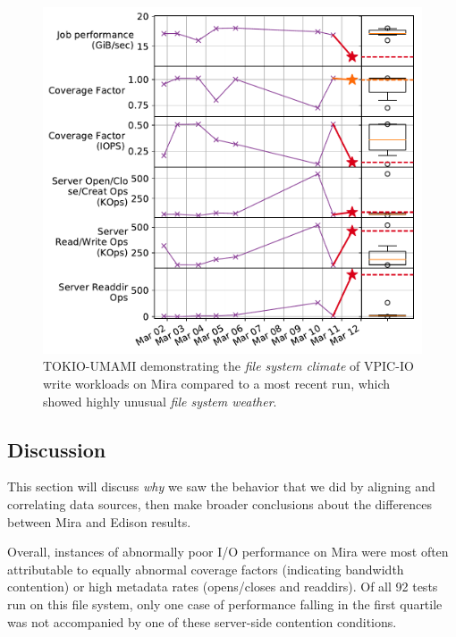 {\begin{figure}[t]
    \centering
    \includegraphics[width=1.0\columnwidth]{figs/umami-mira-fs1-vpic-write.pdf}
    \caption{TOKIO-UMAMI demonstrating the \emph{file system climate} of VPIC-IO write workloads
    on Mira compared to a most recent run, which showed
    highly unusual \emph{file system weather}.}
    \label{fig:umami-mira-fs1-vpic-write}
\end{figure}

\subsection{Discussion} \label{sec:results/discussion}

This section will discuss \emph{why} we saw the behavior that we did by
aligning and correlating data sources, then make broader conclusions about the
differences between Mira and Edison results.

Overall, instances of abnormally poor I/O performance on Mira were most often attributable to equally abnormal coverage factors (indicating bandwidth contention) or high metadata rates (opens/closes and readdirs).  Of all 92 tests run on this file system, only one case of performance falling in the first quartile was not accompanied by one of these server-side contention conditions.

}
